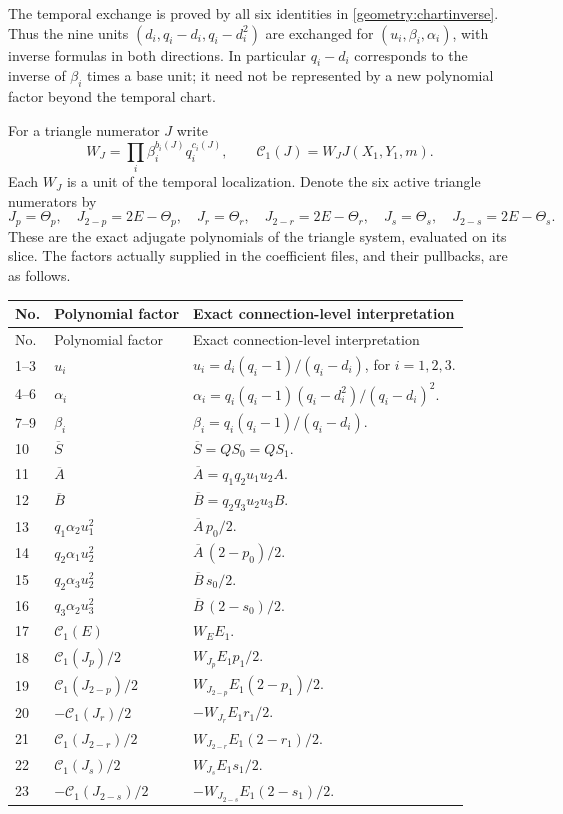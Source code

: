 \documentclass[11pt,a4paper]{article}
\theoremstyle{remark}\newtheorem{remark}[theorem]{Remark}
\newcommand{\Ab}{\overline A}\newcommand{\Bb}{\overline B}
\begin{document}
The temporal exchange is proved by all six identities in
\eqref{geometry:chartinverse}. Thus the nine units
$(d_i,q_i-d_i,q_i-d_i^2)$ are exchanged for
$(u_i,\beta_i,\alpha_i)$, with inverse formulas in both directions.
In particular $q_i-d_i$ corresponds to the inverse of $\beta_i$
times a base unit; it need not be represented by a new polynomial
factor beyond the temporal chart.

For a triangle numerator $J$ write
\[
 W_J=\prod_i\beta_i^{b_i(J)}q_i^{c_i(J)},
 \qquad \mathcal C_1(J)=W_JJ(X_1,Y_1,m).
\]
Each $W_J$ is a unit of the temporal localization. Denote the six
active triangle numerators by
\[
 J_p=\Theta_p,\quad J_{2-p}=2E-\Theta_p,\quad
 J_r=\Theta_r,\quad J_{2-r}=2E-\Theta_r,\quad
 J_s=\Theta_s,\quad J_{2-s}=2E-\Theta_s.
\]
These are the exact adjugate polynomials of the triangle system,
evaluated on its slice. The factors actually supplied in the coefficient
files, and their pullbacks, are as follows.

\begin{center}\small
\begin{longtable}{p{.08\linewidth}p{.24\linewidth}p{.58\linewidth}}
\hline
No.&Polynomial factor&Exact connection-level interpretation\\\hline
\endfirsthead
\hline No.&Polynomial factor&Exact connection-level interpretation\\\hline
\endhead
1--3&$u_i$&$u_i=d_i(q_i-1)/(q_i-d_i)$, for $i=1,2,3$.\\
4--6&$\alpha_i$&$\alpha_i=q_i(q_i-1)(q_i-d_i^2)/(q_i-d_i)^2$.\\
7--9&$\beta_i$&$\beta_i=q_i(q_i-1)/(q_i-d_i)$.\\
10&$\overline S$&$\overline S=QS_0=QS_1$.\\
11&$\Ab$&$\Ab=q_1q_2u_1u_2 A$.\\
12&$\Bb$&$\Bb=q_2q_3u_2u_3 B$.\\
13&$q_1\alpha_2u_1^2$&$\Ab\,p_0/2$.\\
14&$q_2\alpha_1u_2^2$&$\Ab\,(2-p_0)/2$.\\
15&$q_2\alpha_3u_2^2$&$\Bb\,s_0/2$.\\
16&$q_3\alpha_2u_3^2$&$\Bb\,(2-s_0)/2$.\\
17&$\mathcal C_1(E)$&$W_E E_1$.\\
18&$\mathcal C_1(J_p)/2$&$W_{J_p}E_1 p_1/2$.\\
19&$\mathcal C_1(J_{2-p})/2$&$W_{J_{2-p}}E_1(2-p_1)/2$.\\
20&$-\mathcal C_1(J_r)/2$&$-W_{J_r}E_1 r_1/2$.\\
21&$\mathcal C_1(J_{2-r})/2$&$W_{J_{2-r}}E_1(2-r_1)/2$.\\
22&$\mathcal C_1(J_s)/2$&$W_{J_s}E_1 s_1/2$.\\
23&$-\mathcal C_1(J_{2-s})/2$&$-W_{J_{2-s}}E_1(2-s_1)/2$.\\\hline
\end{longtable}
\end{center}
\end{document}
